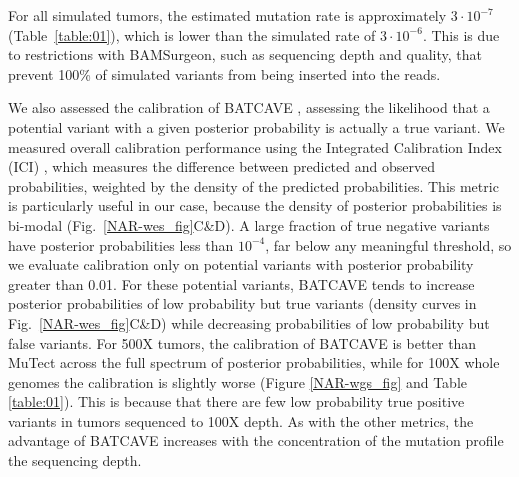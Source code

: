 \documentclass[a4,center,fleqn]{NAR}
\newcommand{\batcave}{BATCAVE }
\begin{document}
For all simulated tumors, the estimated mutation rate is approximately $3\cdot10^{-7}$ (Table~\ref{table:01}), which is lower than the simulated rate of $3\cdot10^{-6}$.
This is due to restrictions with BAMSurgeon, such as sequencing depth and quality, that prevent 100\% of simulated variants from being inserted into the reads.

We also assessed the calibration of \batcave, assessing the likelihood that a potential variant with a given posterior probability is actually a true variant.
We measured overall calibration performance using the Integrated Calibration Index (ICI) \cite{Austin2019}, which measures the difference between predicted and observed probabilities, weighted by the density of the predicted probabilities.
This metric is particularly useful in our case, because the density of posterior probabilities is bi-modal (Fig.~\ref{NAR-wes_fig}C\&D).
A large fraction of true negative variants have posterior probabilities less than $10^{-4}$, far below any meaningful threshold, so we evaluate calibration only on potential variants with posterior probability greater than 0.01.
For these potential variants, \batcave tends to increase posterior probabilities of low probability but true variants (density curves in Fig.~\ref{NAR-wes_fig}C\&D) while decreasing probabilities of low probability but false variants.
For 500X tumors, the calibration of \batcave is better than MuTect across the full spectrum of posterior probabilities, while for 100X whole genomes the calibration is slightly worse (Figure \ref{NAR-wgs_fig} and Table \ref{table:01}).
This is because that there are few low probability true positive variants in tumors sequenced to 100X depth.
As with the other metrics, the advantage of \batcave increases with the concentration of the mutation profile the sequencing depth.
\end{document}
